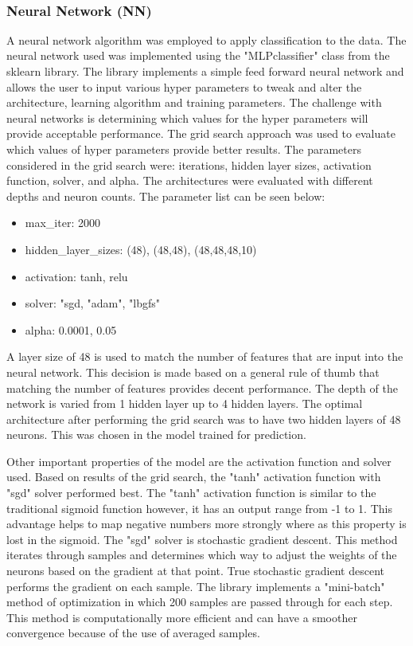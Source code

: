 \\

\subsubsection{Neural Network (NN)}
A neural network algorithm was employed to apply classification to the data. The neural network used was implemented using the "MLPclassifier" class from the sklearn library. The library implements a simple feed forward neural network and allows the user to input various hyper parameters to tweak and alter the architecture, learning algorithm and training parameters. The challenge with neural networks is determining which values for the hyper parameters will provide acceptable performance. The grid search approach was used to evaluate which values of hyper parameters provide better results. The parameters considered in the grid search were: iterations, hidden layer sizes, activation function, solver, and alpha. The architectures were evaluated with different depths and neuron counts. The parameter list can be seen below:

\begin{itemize}
\item max\_iter: 2000
\item hidden\_layer\_sizes: (48), (48,48), (48,48,48,10)
\item activation: tanh, relu
\item solver: "sgd, "adam", "lbgfs"
\item alpha: 0.0001, 0.05
\end{itemize}

A layer size of 48 is used to match the number of features that are input into the neural network. This decision is made based on a general rule of thumb that matching the number of features provides decent performance. The depth of the network is varied from 1 hidden layer up to 4 hidden layers. The optimal architecture after performing the grid search was to have two hidden layers of 48 neurons. This was chosen in the model trained for prediction.

Other important properties of the model are the activation function and solver used. Based on results of the grid search, the "tanh" activation function with "sgd" solver performed best. The "tanh" activation function is similar to the traditional sigmoid function however, it has an output range from -1 to 1. This advantage helps to map negative numbers more strongly where as this property is lost in the sigmoid. The "sgd" solver is stochastic gradient descent. This method iterates through samples and determines which way to adjust the weights of the neurons based on the gradient at that point. True stochastic gradient descent performs the gradient on each sample. The library implements a "mini-batch" method of optimization in which 200 samples are passed through for each step. This method is computationally more efficient and can have a smoother convergence because of the use of averaged samples.



